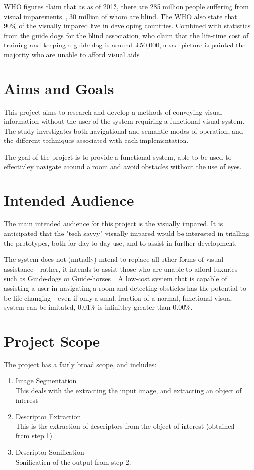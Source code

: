 \ac{WHO} figures claim that as as of 2012, there are 285 million people suffering from visual imparements~\cite{whoblindness}, 30 million of whom are blind. The \ac{WHO} also state that 90\% of the visually impared live in developing countries. Combined with statistics from the guide dogs for the blind association, who claim that the life-time cost of training and keeping a guide dog is around £50,000, a sad picture is painted the majority who are unable to afford visual aids.

\section{Aims and Goals}
This project aims to research and develop a methods of conveying visual information without the user of the system requiring a functional visual system. The study investigates both navigational and semantic modes of operation, and the different techniques associated with each implementation.

The goal of the project is to provide a functional system, able to be used to effectivley navigate around a room and avoid obstacles without the use of eyes.  

\section{Intended Audience}
The main intended audience for this project is the visually impared. It is anticipated that the "tech savvy" visually impared would be interested in trialling the prototypes, both for day-to-day use, and to assist in further development.

The system does not (initially) intend to replace all other forms of visual assistance - rather, it intends to assist those who are unable to afford luxuries such as Guide-dogs or Guide-horses~\cite{guidehorse}. A low-cost system that is capable of assisting a user in navigating a room and detecting obsticles has the potential to be life changing - even if only a small fraction of a normal, functional visual system can be imitated, 0.01\% is infinitley greater than 0.00\%.

\section{Project Scope}
The project has a fairly broad scope, and includes:
\begin{enumerate}
    \item Image Segmentation \hfill \\
    This deals with the extracting the input image, and extracting an object of interest
    \item Descriptor Extraction \hfill \\
    This is the extraction of descriptors from the object of interest (obtained from step 1)
    \item Descriptor Sonification \hfill \\
    Sonification of the output from step 2.
\end{enumerate}

